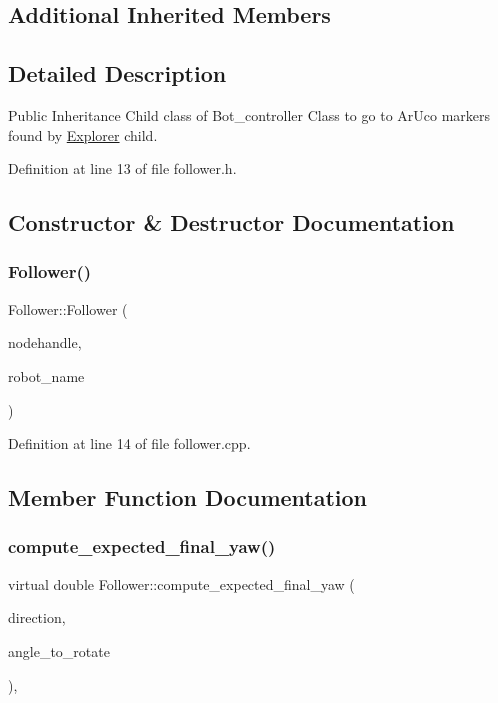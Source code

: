 \subsection*{Additional Inherited Members}


\subsection{Detailed Description}
Public Inheritance Child class of Bot\+\_\+controller Class to go to Ar\+Uco markers found by \hyperlink{class_explorer}{Explorer} child. 

Definition at line 13 of file follower.\+h.



\subsection{Constructor \& Destructor Documentation}
\mbox{\label{class_follower_a6870e654b7cc901944ead12870a6b107}} 
\subsubsection{\texorpdfstring{Follower()}{Follower()}}
{\footnotesize\ttfamily Follower\+::\+Follower (\begin{DoxyParamCaption}\item[{ros\+::\+Node\+Handle $\ast$}]{nodehandle,  }\item[{const std\+::string \&}]{robot\+\_\+name }\end{DoxyParamCaption})}



Definition at line 14 of file follower.\+cpp.



\subsection{Member Function Documentation}
\mbox{\label{class_follower_ab87e93b6fafa6f25137ba60d5860558e}} 
\subsubsection{\texorpdfstring{compute\+\_\+expected\+\_\+final\+\_\+yaw()}{compute\_expected\_final\_yaw()}}
{\footnotesize\ttfamily virtual double Follower\+::compute\+\_\+expected\+\_\+final\+\_\+yaw (\begin{DoxyParamCaption}\item[{bool}]{direction,  }\item[{double}]{angle\+\_\+to\+\_\+rotate }\end{DoxyParamCaption})\hspace{0.3cm}{\ttfamily [override]}, {\ttfamily [virtual]}}



